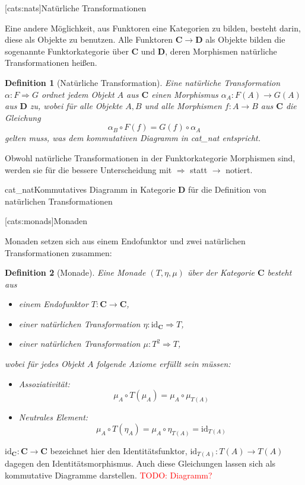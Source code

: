 \documentclass[11pt, a4paper, bibgerm]{scrbook}
\newcommand{\todo}[1]{
  \textcolor{red}{TODO: #1}
}
\newcommand\lsection{}
\newcommand\abb{}
\newcommand\fig{}
\newcommand\ato{\rightarrow} %
\newcommand\nto{\Rightarrow} %
\newtheorem{defini}{Definition}
\newcommand{\defi}[2]{%
  \begin{defini}[#1]
    \label{def:#1}
    #2
  \end{defini}
}
\begin{document}
\lsection[cats:nats]{Natürliche Transformationen}

Eine andere Möglichkeit, aus Funktoren eine Kategorien zu bilden,
besteht darin, diese als Objekte zu benutzen. Alle Funktoren $\mathbf{C}
\ato \mathbf{D}$ als Objekte bilden die sogenannte Funktorkategorie über
$\mathbf{C}$ und $\mathbf{D}$, deren Morphismen natürliche
Transformationen heißen.

\defi{Natürliche Transformation}{Eine natürliche Transformation $\alpha:F \nto
G$ ordnet jedem Objekt $A$ aus $\mathbf{C}$ einen Morphismus
$\alpha_A:F(A) \ato G(A)$ aus $\mathbf{D}$ zu, wobei für alle Objekte
$A,B$ und alle Morphismen $f:A \ato B$ aus $\mathbf{C}$ die
Gleichung
$$\alpha_B \circ F(f) = G(f) \circ \alpha_A $$
gelten muss, was dem kommutativen Diagramm in \abb{cat_nat}
entspricht.
}

Obwohl natürliche Transformationen in der Funktorkategorie Morphismen
sind, werden sie für die bessere Unterscheidung mit $\nto$ statt
$\ato$ notiert.

\fig{cat_nat}{Kommutatives Diagramm in Kategorie $\mathbf{D}$ für die Definition von
  natürlichen Transformationen}

\lsection[cats:monads]{Monaden}

Monaden setzen sich aus einem Endofunktor und zwei natürlichen
Transformationen zusammen:
\defi{Monade}{Eine Monade $(T,\eta,\mu)$ über der Kategorie $\mathbf{C}$ besteht aus
  \begin{itemize}
  \item einem Endofunktor $T:\mathbf{C} \ato \mathbf{C}$,
  \item einer natürlichen Transformation $\eta:\mathrm{id}_{\mathbf{C}} \nto T$,
  \item einer natürlichen Transformation $\mu:T^2 \nto T$,
  \end{itemize}
wobei für jedes Objekt $A$ folgende Axiome erfüllt sein müssen:
\begin{itemize}
\item Assoziativität: $$\mu_A \circ T(\mu_A) = \mu_A \circ \mu_{T(A)}$$
\item Neutrales Element: $$\mu_A \circ T(\eta_A) = \mu_A \circ \eta_{T(A)} = \mathrm{id}_{T(A)}$$
\end{itemize}
} $\mathrm{id}_\mathbf{C}:\mathbf{C} \ato \mathbf{C}$ bezeichnet hier
den Identitätsfunktor, $\mathrm{id}_{T(A)}:T(A) \ato T(A)$ dagegen den
Identitätsmorphismus. Auch diese Gleichungen lassen sich als kommutative
Diagramme darstellen. \todo{Diagramm?}
\end{document}
